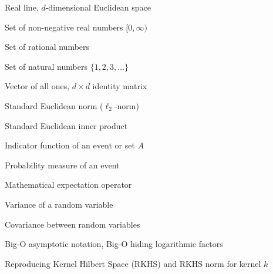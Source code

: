 
\begin{listofsymbols}
\begin{description}

\item{} \quad Real line, $d$-dimensional Euclidean space
\item{} \quad Set of non-negative real numbers $[0, \infty)$
\item{} \quad Set of rational numbers
\item{} \quad Set of natural numbers $\{1, 2, 3, \dots\}$
\item{} \quad Vector of all ones, $d \times d$ identity matrix
\item{\makebox[1.1in][l]{$\lVert \cdot \rVert$}} \quad Standard Euclidean norm ($\ell_2$-norm)
\item{\makebox[1.1in][l]{$\langle \cdot, \cdot \rangle$}} \quad Standard Euclidean inner product
\item{} \quad Indicator function of an event or set $A$

\vspace{0.6em}

\item{} \quad Probability measure of an event
\item{} \quad Mathematical expectation operator
\item{} \quad Variance of a random variable
\item{} \quad Covariance between random variables

\vspace{0.6em}

\item{} \quad Big-O asymptotic notation, Big-O hiding logarithmic factors
\item{} \quad Reproducing Kernel Hilbert Space (RKHS) and RKHS norm for kernel $k$

\end{description}
\end{listofsymbols}
